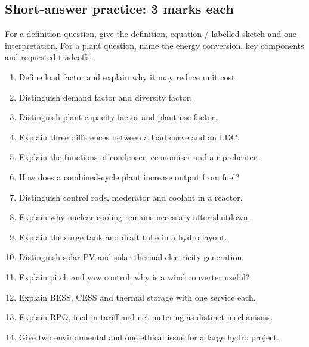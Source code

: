 \documentclass[11pt,a4paper]{article}
\begin{document}
\subsection{Short-answer practice: 3 marks each}
For a definition question, give the definition, equation / labelled sketch and one interpretation. For a plant question, name the energy conversion, key components and requested tradeoffs.
\begin{enumerate}[label=\textbf{S\arabic*.}]
\item Define load factor and explain why it may reduce unit cost.
\item Distinguish demand factor and diversity factor.
\item Distinguish plant capacity factor and plant use factor.
\item Explain three differences between a load curve and an LDC.
\item Explain the functions of condenser, economiser and air preheater.
\item How does a combined-cycle plant increase output from fuel?
\item Distinguish control rods, moderator and coolant in a reactor.
\item Explain why nuclear cooling remains necessary after shutdown.
\item Explain the surge tank and draft tube in a hydro layout.
\item Distinguish solar PV and solar thermal electricity generation.
\item Explain pitch and yaw control; why is a wind converter useful?
\item Explain BESS, CESS and thermal storage with one service each.
\item Explain RPO, feed-in tariff and net metering as distinct mechanisms.
\item Give two environmental and one ethical issue for a large hydro project.
\end{enumerate}
\end{document}
